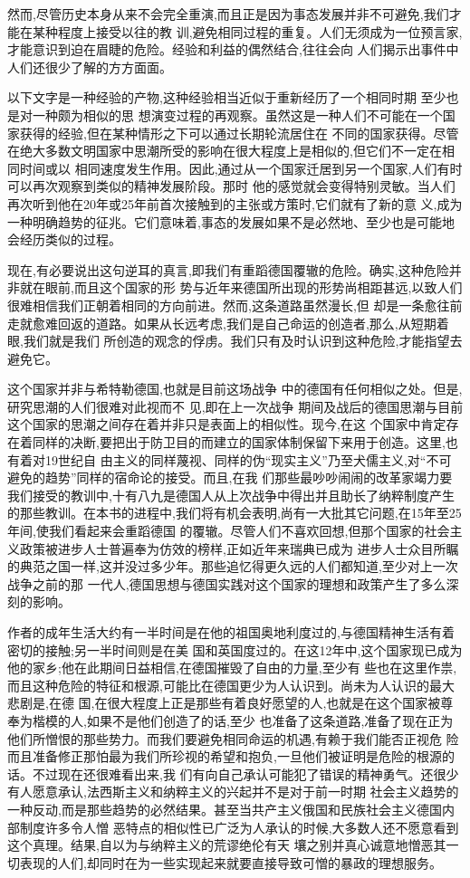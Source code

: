 ﻿\documentclass[12pt]{article}
\begin{document}
然而,尽管历史本身从来不会完全重演,而且正是因为事态发展并非不可避免,我们才能在某种程度上接受以往的教
训,避免相同过程的重复。人们无须成为一位预言家,才能意识到迫在眉睫的危险。经验和利益的偶然结合,往往会向
人们揭示出事件中人们还很少了解的方方面面。

以下文字是一种经验的产物,这种经验相当近似于重新经历了一个相同时期 \myrule 至少也是对一种颇为相似的思
想演变过程的再观察。虽然这是一种人们不可能在一个国家获得的经验,但在某种情形之下可以通过长期轮流居住在
不同的国家获得。尽管在绝大多数文明国家中思潮所受的影响在很大程度上是相似的,但它们不一定在相同时间或以
相同速度发生作用。因此,通过从一个国家迁居到另一个国家,人们有时可以再次观察到类似的精神发展阶段。那时
他的感觉就会变得特别灵敏。当人们再次听到他在20年或25年前首次接触到的主张或方策时,它们就有了新的意
义,成为一种明确趋势的征兆。它们意味着,事态的发展如果不是必然地、至少也是可能地会经历类似的过程。

现在,有必要说出这句逆耳的真言,即我们有重蹈德国覆辙的危险。确实,这种危险并非就在眼前,而且这个国家的形
势与近年来德国所出现的形势尚相距甚远,以致人们很难相信我们正朝着相同的方向前进。然而,这条道路虽然漫长,但
却是一条愈往前走就愈难回返的道路。如果从长远考虑,我们是自己命运的创造者,那么,从短期着眼,我们就是我们
所创造的观念的俘虏。我们只有及时认识到这种危险,才能指望去避免它。

这个国家并非与希特勒德国,也就是目前这场战争 中的德国有任何相似之处。但是,研究思潮的人们很难对此视而不
见,即在上一次战争 期间及战后的德国思潮与目前这个国家的思潮之间存在着并非只是表面上的相似性。现今,在这
个国家中肯定存在着同样的决断,要把出于防卫目的而建立的国家体制保留下来用于创造。这里,也有着对19世纪自
由主义的同样蔑视、同样的伪``现实主义''乃至犬儒主义,对``不可避免的趋势''同样的宿命论的接受。而且,在我
们那些最吵吵闹闹的改革家竭力要我们接受的教训中,十有八九是德国人从上次战争中得出并且助长了纳粹制度产生
的那些教训。在本书的进程中,我们将有机会表明,尚有一大批其它问题,在15年至25年间,使我们看起来会重蹈德国
的覆辙。尽管人们不喜欢回想,但那个国家的社会主义政策被进步人士普遍奉为仿效的榜样,正如近年来瑞典已成为
进步人士众目所瞩的典范之国一样,这并没过多少年。那些追忆得更久远的人们都知道,至少对上一次战争之前的那
一代人,德国思想与德国实践对这个国家的理想和政策产生了多么深刻的影响。

作者的成年生活大约有一半时间是在他的祖国奥地利度过的,与德国精神生活有着密切的接触;另一半时间则是在美
国和英国度过的。在这12年中,这个国家现已成为他的家乡;他在此期间日益相信,在德国摧毁了自由的力量,至少有
些也在这里作祟,而且这种危险的特征和根源,可能比在德国更少为人认识到。尚未为人认识的最大悲剧是,在德
国,在很大程度上正是那些有着良好愿望的人,也就是在这个国家被尊奉为楷模的人,如果不是他们创造了的话,至少
也准备了这条道路,准备了现在正为他们所憎恨的那些势力。而我们要避免相同命运的机遇,有赖于我们能否正视危
险而且准备修正那怕最为我们所珍视的希望和抱负,一旦他们被证明是危险的根源的话。不过现在还很难看出来,我
们有向自己承认可能犯了错误的精神勇气。还很少有人愿意承认,法西斯主义和纳粹主义的兴起并不是对于前一时期
社会主义趋势的一种反动,而是那些趋势的必然结果。甚至当共产主义俄国和民族社会主义德国内部制度许多令人憎
恶特点的相似性已广泛为人承认的时候,大多数人还不愿意看到这个真理。结果,自以为与纳粹主义的荒谬绝伦有天
壤之别并真心诚意地憎恶其一切表现的人们,却同时在为一些实现起来就要直接导致可憎的暴政的理想服务。
\end{document}
